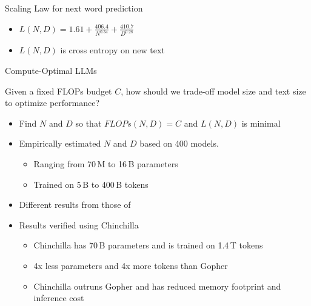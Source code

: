 
\begin{vbframe}{Scaling Law for next word prediction}

\vfill

\begin{itemize}
    \item $L(N,D) = 1.61 + \frac{406.4}{N^{0.34}} + \frac{410.7}{D^{0.28}}$
    \item $L(N,D)$ is cross entropy on new text
\end{itemize}

\vfill

\end{vbframe}


\begin{vbframe}{Compute-Optimal LLM\MakeLowercase{s}}

Given a fixed FLOPs budget $C$, how should we trade-off model size and text size to optimize performance? 

\vfill

\begin{itemize}

	\item Find $N$ and $D$ so that $FLOPs(N,D) = C$ and $L(N,D)$ is minimal

	\item Empirically estimated $N$ and $D$ based on 400 models. 
	\begin{itemize}
	\item Ranging from 70\,M to 16\,B parameters
	\item Trained on 5\,B to 400\,B tokens
	\end{itemize}

	\item Different results from those of  
	\item Results verified using Chinchilla
	\begin{itemize}
	\item Chinchilla has 70\,B parameters and is trained on 1.4\,T tokens
	\item 4x less parameters and 4x more tokens than Gopher
	\item Chinchilla outruns Gopher and has reduced memory footprint and inference cost 
	\end{itemize}

\end{itemize}

\vfill

\end{vbframe}

